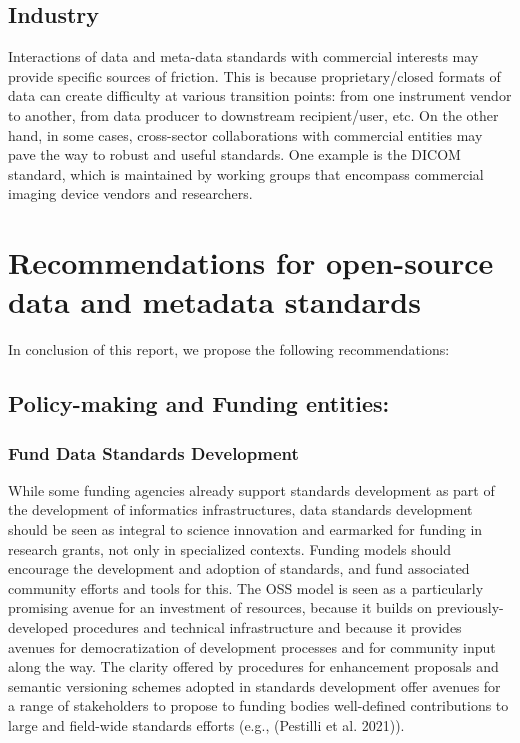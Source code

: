 \documentclass[
  letterpaper,
  DIV=11,
  numbers=noendperiod]{scrartcl}
\begin{document}
\subsection{Industry}\label{industry}

Interactions of data and meta-data standards with commercial interests
may provide specific sources of friction. This is because
proprietary/closed formats of data can create difficulty at various
transition points: from one instrument vendor to another, from data
producer to downstream recipient/user, etc. On the other hand, in some
cases, cross-sector collaborations with commercial entities may pave the
way to robust and useful standards. One example is the DICOM standard,
which is maintained by working groups that encompass commercial imaging
device vendors and researchers.

\section{Recommendations for open-source data and metadata
standards}\label{sec-recommendations}

In conclusion of this report, we propose the following recommendations:

\subsection{Policy-making and Funding
entities:}\label{policy-making-and-funding-entities}

\subsubsection{Fund Data Standards
Development}\label{fund-data-standards-development}

While some funding agencies already support standards development as
part of the development of informatics infrastructures, data standards
development should be seen as integral to science innovation and
earmarked for funding in research grants, not only in specialized
contexts. Funding models should encourage the development and adoption
of standards, and fund associated community efforts and tools for this.
The OSS model is seen as a particularly promising avenue for an
investment of resources, because it builds on previously-developed
procedures and technical infrastructure and because it provides avenues
for democratization of development processes and for community input
along the way. The clarity offered by procedures for enhancement
proposals and semantic versioning schemes adopted in standards
development offer avenues for a range of stakeholders to propose to
funding bodies well-defined contributions to large and field-wide
standards efforts (e.g., (Pestilli et al. 2021)).
\end{document}
